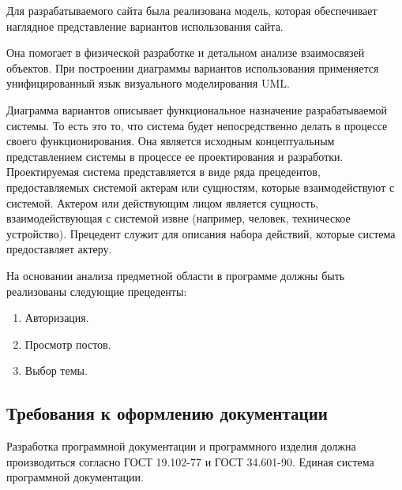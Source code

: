 Для разрабатываемого сайта была реализована модель, которая обеспечивает наглядное представление вариантов использования сайта.

Она помогает в физической разработке и детальном анализе взаимосвязей объектов. При построении диаграммы вариантов использования применяется унифицированный язык визуального моделирования UML.

Диаграмма вариантов описывает функциональное назначение разрабатываемой системы. То есть это то, что система будет непосредственно делать в процессе своего функционирования. Она является исходным концептуальным представлением системы в процессе ее проектирования и разработки. Проектируемая система представляется в виде ряда прецедентов, предоставляемых системой актерам или сущностям, которые взаимодействуют с системой. Актером или действующим лицом является сущность, взаимодействующая с системой извне (например, человек, техническое устройство). Прецедент служит для описания набора действий, которые система предоставляет актеру.

На основании анализа предметной области в программе должны быть реализованы следующие прецеденты:
\begin{enumerate}
\item Авторизация.
\item Просмотр постов.
\item Выбор темы.
\end{enumerate}

\subsection{Требования к оформлению документации}

Разработка программной документации и программного изделия должна производиться согласно ГОСТ 19.102-77 и ГОСТ 34.601-90. Единая система программной документации.
